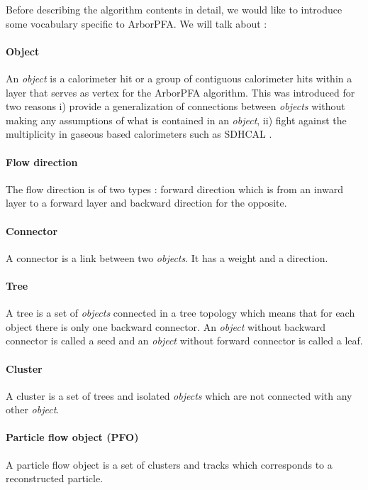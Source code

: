 \documentclass[cits]{JINST}
\begin{document}
Before describing the algorithm contents in detail, we would like to introduce some vocabulary specific to ArborPFA. We will talk about :

\paragraph*{Object} An \textit{object} is a calorimeter hit or a group of contiguous calorimeter hits within a layer that serves as vertex for the ArborPFA algorithm. This was introduced for two reasons i) provide a generalization of connections between \textit{objects} without making any assumptions of what is contained in an \textit{object}, ii) fight against the multiplicity in gaseous based calorimeters such as SDHCAL \cite{sdhcal-paper}.

\paragraph*{Flow direction} The flow direction is of two types : forward direction which is from an inward layer to a forward layer and backward direction for the opposite.

\paragraph*{Connector} A connector is a link between two \textit{objects}. It has a weight and a direction.

\paragraph*{Tree} A tree is a set of \textit{objects} connected in a tree topology which means that for each object there is only one backward connector. An \textit{object} without backward connector is called a seed and an \textit{object} without forward connector is called a leaf.

\paragraph*{Cluster} A cluster is a set of trees and isolated \textit{objects} which are not connected with any other \textit{object}.

\paragraph*{Particle flow object (PFO)} A particle flow object is a set of clusters and tracks which corresponds to a reconstructed particle.
\end{document}
